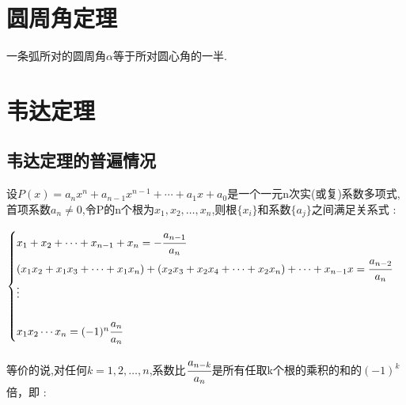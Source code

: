 {\section{圆周角定理}{
    一条弧所对的圆周角$\alpha$等于所对圆心角的一半.


}%

\section{韦达定理}{
\subsection{韦达定理的普遍情况}{
设$P(x) = a_nx^n + a_{n-1}x^{n-1} + \dotsm + a_1x + a_0$是一个一元n次实(或复)系数多项式,首项系数$a_n \neq 0$,令P的n个根为$x_1,x_2,\dots,x_n$,则根$\{x_i\}$和系数$\{a_j\}$之间满足关系式 :

$$
    \begin{cases}
        x_1 + x_2 + \dotsm + x_{n-1} + x_n = -\cfrac{a_{n-1}}{a_n}                                                           \\
        (x_1x_2 + x_1x_3 + \dotsm + x_1x_n) + (x_2x_3 + x_2x_4 + \dotsm + x_2x_n) + \dotsm + x_{n-1}x = \cfrac{a_{n-2}}{a_n} \\
        \vdots                                                                                                               \\                                                                                                               \\
        x_1x_2 \dotsm x_n = (-1)^n\cfrac{a_n}{a_n}
    \end{cases}
$$

等价的说,对任何$k = 1,2,\dots,n$,系数比$\cfrac{a_{n-k}}{a_n}$是所有任取k个根的乘积的和的$(-1)^k$倍，即 :

}}}
